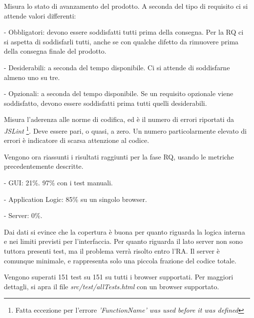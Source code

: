 Misura lo stato di avanzamento del prodotto. A seconda del tipo di requisito ci si attende valori differenti:
\begin{elencopuntato}[\subsecindent]
\item[-] Obbligatori: devono essere soddisfatti tutti prima della consegna. Per la RQ ci si aspetta di soddisfarli tutti, anche se con qualche difetto da rimuovere prima della consegna finale del prodotto.
\item[-] Desiderabili: a seconda del tempo disponibile. Ci si attende di soddisfarne almeno uno su tre.
\item[-] Opzionali: a seconda del tempo disponibile. Se un requisito opzionale viene soddisfatto, devono essere soddisfatti prima tutti quelli desiderabili.
\end{elencopuntato}

Misura l'aderenza alle norme di codifica, ed \`e il numero di errori riportati da \textit{JSLint} \footnote{Fatta eccezione per l'errore \textit{'FunctionName' was used before it was defined}}. Deve essere pari, o quasi, a zero. Un numero particolarmente elevato di errori \`e indicatore di scarsa attenzione al codice.

 

Vengono ora riassunti i risultati raggiunti per la fase RQ, usando le metriche precedentemente descritte.
\begin{elencopuntato}[\subsubsecindent]
\item[-] GUI: 21\%. 97\% con i test manuali.
\item[-] Application Logic: 85\% su un singolo browser.
\item[-] Server: 0\%.
\end{elencopuntato}
Dai dati si evince che la copertura \`e buona per quanto riguarda la logica interna e nei limiti previsti per l'interfaccia. Per quanto riguarda il lato server non sono tuttora presenti test, ma il problema verr\`a risolto entro l'RA. Il server \`e comunque minimale, e rappresenta solo una piccola frazione del codice totale.

Vengono superati 151 test su 151 su tutti i browser supportati. Per maggiori dettagli, si apra il file \textit{src/test/allTests.html} con un browser supportato.

